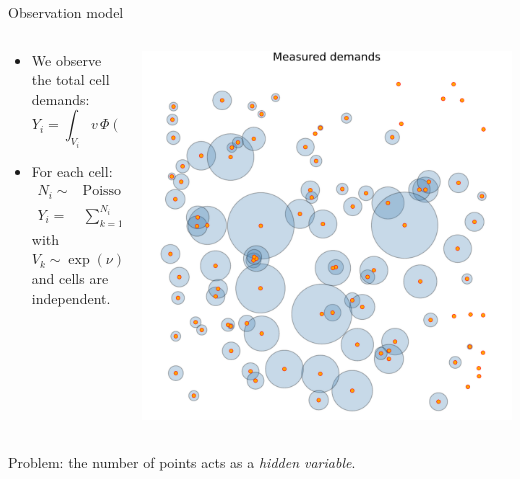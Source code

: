 \documentclass[aspectratio=169]{beamer}
\begin{document}
\begin{frame}{Observation model}

	\begin{columns}
		
		\begin{column}{0.5\textwidth}
			\begin{itemize}
				\item We observe the total cell demands:
					\begin{equation*}
						Y_i = \int_{V_i} v \,\Phi(dx,dv) = \sum_{k} v_k \mathbf{1}_{\{x_k\in V_i\}}
					\end{equation*}

				\item For each cell:
				\begin{eqnarray*}
					N_i \sim& \mathrm{Poisson}(\lambda_i(\theta))\\
					Y_i =& \sum_{k=1}^{N_i} V_k
				\end{eqnarray*}
				with $V_k\sim\exp(\nu)$ and cells are independent.
			\end{itemize}
		\end{column}

		\begin{column}{0.5\textwidth}
			\centering
			\includegraphics[width=0.9\columnwidth]{figuras/measured_demands.pdf}
		\end{column}
		
	\end{columns}
		\vfill


		\alert{Problem:} the number of points acts as a \emph{hidden variable}.

\end{frame}
	
\end{document}
